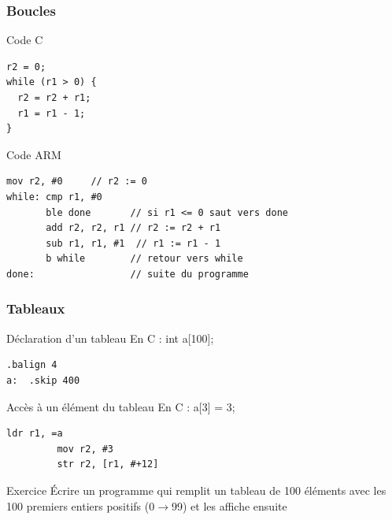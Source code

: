 \documentclass{beamer}
\begin{document}
\begin{frame}[fragile]
\frametitle{Boucles}

\begin{block}{Code C}
{\small
\begin{lstlisting}[style=C]
r2 = 0;
while (r1 > 0) {
  r2 = r2 + r1;
  r1 = r1 - 1;
}
\end{lstlisting}}
\end{block}

\begin{block}{Code ARM}
{\small
\begin{lstlisting}[style=arm]
       mov r2, #0     // r2 := 0
while: cmp r1, #0
       ble done       // si r1 <= 0 saut vers done
       add r2, r2, r1 // r2 := r2 + r1
       sub r1, r1, #1  // r1 := r1 - 1
       b while        // retour vers while
done:                 // suite du programme
\end{lstlisting}}
\end{block}
\end{frame}

\begin{frame}[fragile]
\frametitle{Tableaux}
\begin{block}{Déclaration d'un tableau}
  En C : int a[100];
\begin{lstlisting}[style=arm]
	.balign 4
a:	.skip 400
\end{lstlisting}

\end{block}

\begin{block}{Accès à un élément du tableau}
En C : a[3] = 3;
  \begin{lstlisting}[style=arm]
         ldr r1, =a
         mov r2, #3
         str r2, [r1, #+12]
\end{lstlisting}

\end{block}

\begin{block}{Exercice}
  Écrire un programme qui remplit un tableau de 100 éléments avec les
  100 premiers entiers positifs (0$\rightarrow$99) et les affiche ensuite
\end{block}
\end{frame}
\end{document}
